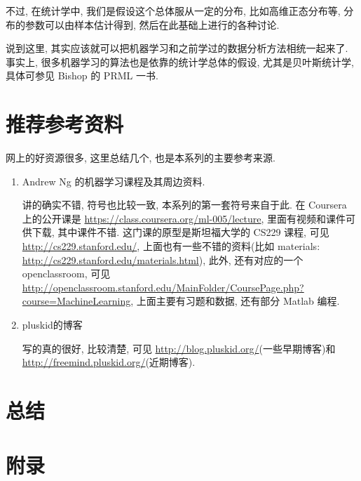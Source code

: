 \documentclass[a4paper,UTF8]{ctexart}
\theoremstyle{plain} \newtheorem{theorem}{定理}[section]
\theoremstyle{plain} \newtheorem{definition}{定义}[section]
\theoremstyle{plain} \newtheorem{lemma}{引理}[section]
\theoremstyle{plain} \newtheorem{proposition}{命题}[section]
\theoremstyle{plain} \newtheorem{example}{例}[section]
\theoremstyle{plain} \newtheorem{remark}{注}[section]
\theoremstyle{plain} \newtheorem{corollary}{推论}[section]
\begin{document}
不过, 在统计学中, 我们是假设这个总体服从一定的分布, 比如高维正态分布等, 分布的参数可以由样本估计得到, 然后在此基础上进行的各种讨论.

说到这里, 其实应该就可以把机器学习和之前学过的数据分析方法相统一起来了. 事实上, 很多机器学习的算法也是依靠的统计学总体的假设, 尤其是贝叶斯统计学, 具体可参见 Bishop 的 PRML 一书.



\section{推荐参考资料}
网上的好资源很多, 这里总结几个, 也是本系列的主要参考来源.
\begin{enumerate}[(1)]
\item Andrew Ng 的机器学习课程及其周边资料.

讲的确实不错, 符号也比较一致, 本系列的第一套符号来自于此. 在 Coursera 上的公开课是 \url{https://class.coursera.org/ml-005/lecture}, 里面有视频和课件可供下载, 其中课件不错. 这门课的原型是斯坦福大学的 CS229 课程, 可见 \url{http://cs229.stanford.edu/}, 上面也有一些不错的资料(比如 materials: \url{http://cs229.stanford.edu/materials.html}), 此外, 还有对应的一个 openclassroom, 可见 \url{http://openclassroom.stanford.edu/MainFolder/CoursePage.php?course=MachineLearning}, 上面主要有习题和数据, 还有部分 Matlab 编程.

\item pluskid的博客

写的真的很好, 比较清楚, 可见 \url{http://blog.pluskid.org/}(一些早期博客)和 \url{http://freemind.pluskid.org/}(近期博客).


\end{enumerate}











\section{总结}






\newpage

\section*{附录}
\end{document}
